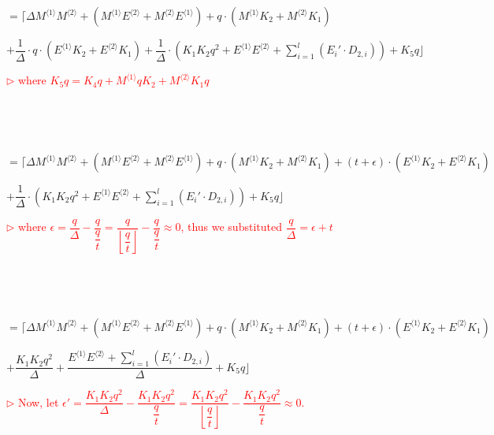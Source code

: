 $ = \Bigg\lceil\Delta M^{\langle 1 \rangle}M^{\langle 2 \rangle} + (M^{\langle 1 \rangle}E^{\langle 2 \rangle} + M^{\langle 2 \rangle}E^{\langle 1 \rangle}) + q\cdot (M^{\langle 1 \rangle}K_2 +  M^{\langle 2 \rangle}K_1) $

\text{ } \text{ } $+ \dfrac{1}{\Delta}\cdot q\cdot(E^{\langle 1 \rangle}K_2 + E^{\langle 2 \rangle}K_1) + \dfrac{1}{\Delta}\cdot (K_1K_2q^2 
 + E^{\langle 1 \rangle} E^{\langle 2 \rangle} + \sum\limits_{i=1}^{l} (E_i'\cdot D_{2,i})) + K_5q\Bigg\rfloor $ 

\text{ } \text{ }  \textcolor{red}{ $\rhd$ where $K_5q = K_4q + M^{\langle 1 \rangle}q K_2 + M^{\langle 2 \rangle} K_1q$}




$ $

$ $

$ = \Bigg\lceil\Delta M^{\langle 1 \rangle}M^{\langle 2 \rangle} + (M^{\langle 1 \rangle}E^{\langle 2 \rangle} + M^{\langle 2 \rangle}E^{\langle 1 \rangle}) + q\cdot (M^{\langle 1 \rangle}K_2 +  M^{\langle 2 \rangle}K_1) + (t + \epsilon)\cdot(E^{\langle 1 \rangle}K_2 + E^{\langle 2 \rangle}K_1) $

\text{ } \text{ } $+  \dfrac{1}{\Delta}\cdot (K_1K_2q^2 
 + E^{\langle 1 \rangle} E^{\langle 2 \rangle} + \sum\limits_{i=1}^{l} (E_i'\cdot D_{2,i})) + K_5q\Bigg\rfloor $ 

\text{ } \text{ }  \textcolor{red}{ $\rhd$ where $\epsilon = \dfrac{q}{\Delta} - \dfrac{q}{\dfrac{q}{t}} = \dfrac{q}{\left\lfloor\dfrac{q}{t}\right\rfloor} - \dfrac{q}{\dfrac{q}{t}} \approx 0$, thus we substituted $\dfrac{q}{\Delta} = \epsilon + t$}


 $ $

 $ $

$ = \Bigg\lceil\Delta M^{\langle 1 \rangle}M^{\langle 2 \rangle} + (M^{\langle 1 \rangle}E^{\langle 2 \rangle} + M^{\langle 2 \rangle}E^{\langle 1 \rangle}) + q\cdot (M^{\langle 1 \rangle}K_2 +  M^{\langle 2 \rangle}K_1) + (t + \epsilon)\cdot(E^{\langle 1 \rangle}K_2 + E^{\langle 2 \rangle}K_1)$

\text{ } \text{ } $ + \dfrac{K_1K_2q^2}{\Delta}   
 + \dfrac{E^{\langle 1 \rangle} E^{\langle 2 \rangle} + \sum\limits_{i=1}^{l} (E_i'\cdot D_{2,i})}{\Delta} + K_5q\Bigg\rfloor $

\text{ } \text{ }  \textcolor{red}{ $\rhd$ Now, let $\epsilon' = \dfrac{K_1K_2q^2}{\Delta} - \dfrac{K_1K_2q^2}{\dfrac{q}{t}} = \dfrac{K_1K_2q^2}{\left\lfloor\dfrac{q}{t}\right\rfloor} - \dfrac{K_1K_2q^2}{\dfrac{q}{t}} \approx 0$.}

